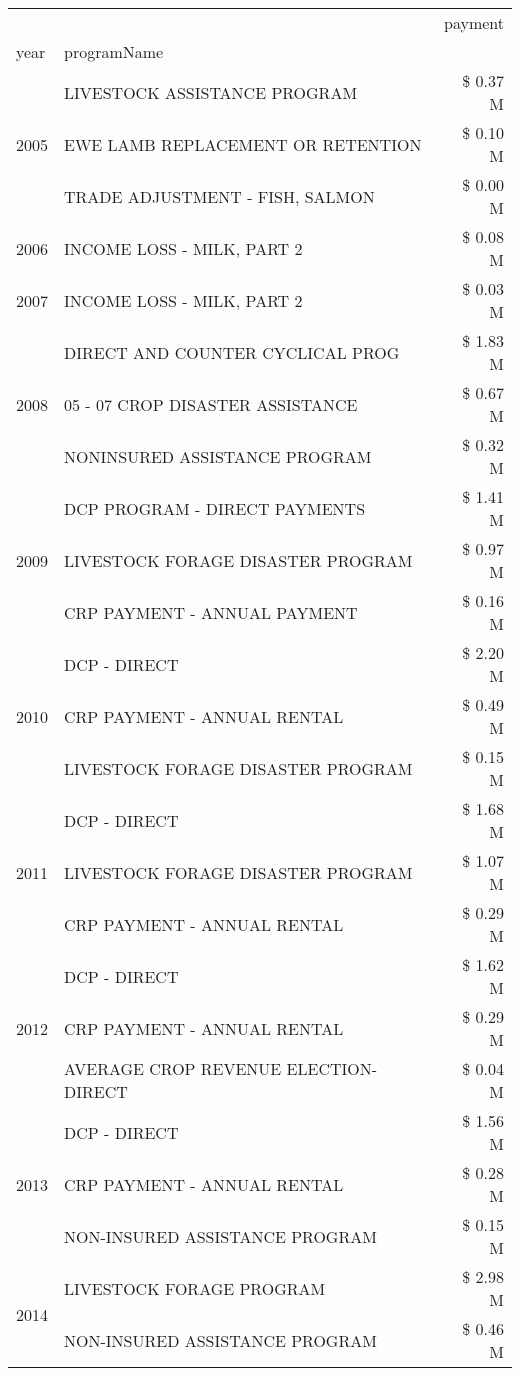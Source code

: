 \begin{tabular}{llr}
\toprule
 &  & payment \\
year & programName &  \\
\midrule
\multirow[t]{3}{*}{2005} & LIVESTOCK ASSISTANCE PROGRAM & \$ 0.37 M \\
 & EWE LAMB REPLACEMENT OR RETENTION & \$ 0.10 M \\
 & TRADE ADJUSTMENT - FISH, SALMON & \$ 0.00 M \\
\cline{1-3}
2006 & INCOME LOSS - MILK, PART 2 & \$ 0.08 M \\
\cline{1-3}
2007 & INCOME LOSS - MILK, PART 2 & \$ 0.03 M \\
\cline{1-3}
\multirow[t]{3}{*}{2008} & DIRECT AND COUNTER CYCLICAL PROG & \$ 1.83 M \\
 & 05 - 07 CROP DISASTER ASSISTANCE & \$ 0.67 M \\
 & NONINSURED ASSISTANCE PROGRAM & \$ 0.32 M \\
\cline{1-3}
\multirow[t]{3}{*}{2009} & DCP PROGRAM - DIRECT PAYMENTS & \$ 1.41 M \\
 & LIVESTOCK FORAGE DISASTER  PROGRAM & \$ 0.97 M \\
 & CRP PAYMENT - ANNUAL PAYMENT & \$ 0.16 M \\
\cline{1-3}
\multirow[t]{3}{*}{2010} & DCP - DIRECT & \$ 2.20 M \\
 & CRP PAYMENT - ANNUAL RENTAL & \$ 0.49 M \\
 & LIVESTOCK FORAGE DISASTER PROGRAM & \$ 0.15 M \\
\cline{1-3}
\multirow[t]{3}{*}{2011} & DCP - DIRECT & \$ 1.68 M \\
 & LIVESTOCK FORAGE DISASTER PROGRAM & \$ 1.07 M \\
 & CRP PAYMENT - ANNUAL RENTAL & \$ 0.29 M \\
\cline{1-3}
\multirow[t]{3}{*}{2012} & DCP - DIRECT & \$ 1.62 M \\
 & CRP PAYMENT - ANNUAL RENTAL & \$ 0.29 M \\
 & AVERAGE CROP REVENUE ELECTION-DIRECT & \$ 0.04 M \\
\cline{1-3}
\multirow[t]{3}{*}{2013} & DCP - DIRECT & \$ 1.56 M \\
 & CRP PAYMENT - ANNUAL RENTAL & \$ 0.28 M \\
 & NON-INSURED ASSISTANCE PROGRAM & \$ 0.15 M \\
\cline{1-3}
\multirow[t]{3}{*}{2014} & LIVESTOCK FORAGE PROGRAM & \$ 2.98 M \\
 & NON-INSURED ASSISTANCE PROGRAM & \$ 0.46 M \\

\end{tabular}
